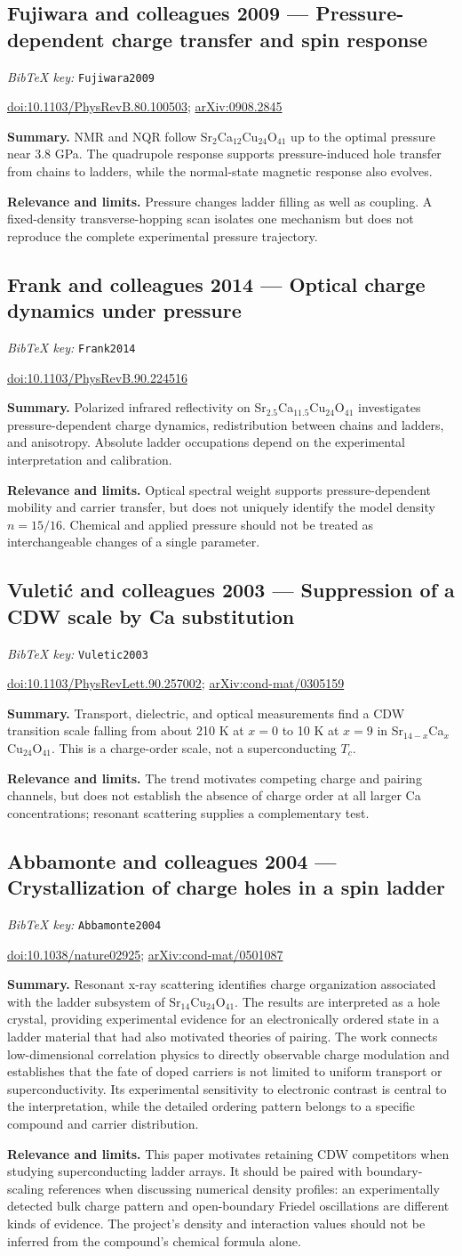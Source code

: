 \documentclass[11pt]{article}
\newcommand{\paper}[2]{\Needspace{8\baselineskip}\subsection{#2}\label{paper:#1}\textit{BibTeX key:} \texttt{#1}\quad\citep{#1}\par}
\newcommand{\doi}[1]{\href{https://doi.org/#1}{doi:#1}}
\newcommand{\arxiv}[1]{\href{https://arxiv.org/abs/#1}{arXiv:#1}}
\newcommand{\summary}{\par\textbf{Summary.} }
\newcommand{\relevance}{\par\textbf{Relevance and limits.} }
\begin{document}
\paper{Fujiwara2009}{Fujiwara and colleagues 2009 --- Pressure-dependent charge transfer and spin response}
\doi{10.1103/PhysRevB.80.100503}; \arxiv{0908.2845}
\summary NMR and NQR follow Sr$_2$Ca$_{12}$Cu$_{24}$O$_{41}$ up to the optimal pressure near 3.8 GPa. The quadrupole response supports pressure-induced hole transfer from chains to ladders, while the normal-state magnetic response also evolves.
\relevance Pressure changes ladder filling as well as coupling. A fixed-density transverse-hopping scan isolates one mechanism but does not reproduce the complete experimental pressure trajectory.

\paper{Frank2014}{Frank and colleagues 2014 --- Optical charge dynamics under pressure}
\doi{10.1103/PhysRevB.90.224516}
\summary Polarized infrared reflectivity on Sr$_{2.5}$Ca$_{11.5}$Cu$_{24}$O$_{41}$ investigates pressure-dependent charge dynamics, redistribution between chains and ladders, and anisotropy. Absolute ladder occupations depend on the experimental interpretation and calibration.
\relevance Optical spectral weight supports pressure-dependent mobility and carrier transfer, but does not uniquely identify the model density $n=15/16$. Chemical and applied pressure should not be treated as interchangeable changes of a single parameter.

\paper{Vuletic2003}{Vuleti\'c and colleagues 2003 --- Suppression of a CDW scale by Ca substitution}
\doi{10.1103/PhysRevLett.90.257002}; \arxiv{cond-mat/0305159}
\summary Transport, dielectric, and optical measurements find a CDW transition scale falling from about 210 K at $x=0$ to 10 K at $x=9$ in Sr$_{14-x}$Ca$_x$Cu$_{24}$O$_{41}$. This is a charge-order scale, not a superconducting $T_c$.
\relevance The trend motivates competing charge and pairing channels, but does not establish the absence of charge order at all larger Ca concentrations; resonant scattering supplies a complementary test.

\paper{Abbamonte2004}{Abbamonte and colleagues 2004 --- Crystallization of charge holes in a spin ladder}
\doi{10.1038/nature02925}; \arxiv{cond-mat/0501087}
\summary Resonant x-ray scattering identifies charge organization associated with the ladder subsystem of $\mathrm{Sr}_{14}\mathrm{Cu}_{24}\mathrm{O}_{41}$. The results are interpreted as a hole crystal, providing experimental evidence for an electronically ordered state in a ladder material that had also motivated theories of pairing. The work connects low-dimensional correlation physics to directly observable charge modulation and establishes that the fate of doped carriers is not limited to uniform transport or superconductivity. Its experimental sensitivity to electronic contrast is central to the interpretation, while the detailed ordering pattern belongs to a specific compound and carrier distribution.
\relevance This paper motivates retaining CDW competitors when studying superconducting ladder arrays. It should be paired with boundary-scaling references when discussing numerical density profiles: an experimentally detected bulk charge pattern and open-boundary Friedel oscillations are different kinds of evidence. The project's density and interaction values should not be inferred from the compound's chemical formula alone.
\end{document}
